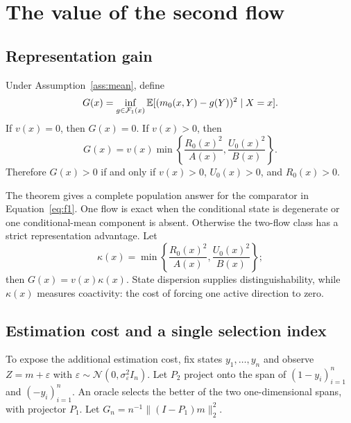 \section{The value of the second flow}
\label{sec:value}

\subsection{Representation gain}

\begin{theorem}
\label{thm:gap}
Under Assumption~\ref{ass:mean}, define
\begin{equation}
G(x)=\inf_{g\in\mathcal{F}_1(x)}\mathbb{E}[(m_0(x,Y)-g(Y))^2\mid X=x].
\label{eq:gap_definition}
\end{equation}
If $v(x)=0$, then $G(x)=0$. If $v(x)>0$, then
\begin{equation}
G(x)=v(x)\min\left\{\frac{R_0(x)^2}{A(x)},\frac{U_0(x)^2}{B(x)}\right\}.
\label{eq:gap_result}
\end{equation}
Therefore $G(x)>0$ if and only if $v(x)>0$, $U_0(x)>0$, and $R_0(x)>0$.
\end{theorem}

The theorem gives a complete population answer for the comparator in Equation~\eqref{eq:f1}. One flow is exact when the conditional state is degenerate or one conditional-mean component is absent. Otherwise the two-flow class has a strict representation advantage. Let
\begin{equation}
\kappa(x)=\min\left\{\frac{R_0(x)^2}{A(x)},\frac{U_0(x)^2}{B(x)}\right\};
\label{eq:kappa}
\end{equation}
then $G(x)=v(x)\kappa(x)$. State dispersion supplies distinguishability, while $\kappa(x)$ measures coactivity: the cost of forcing one active direction to zero.

\subsection{Estimation cost and a single selection index}

To expose the additional estimation cost, fix states $y_1,\ldots,y_n$ and observe $Z=m+\varepsilon$ with $\varepsilon\sim\mathcal N(0,\sigma_\varepsilon^2 I_n)$. Let $P_2$ project onto the span of $(1-y_i)_{i=1}^n$ and $(-y_i)_{i=1}^n$. An oracle selects the better of the two one-dimensional spans, with projector $P_1$. Let $G_n=n^{-1}\|(I-P_1)m\|_2^2$.

